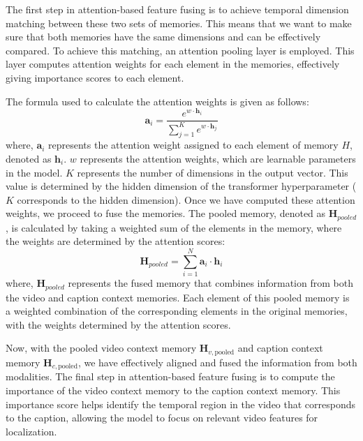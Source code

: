 The first step in attention-based feature fusing is to achieve temporal dimension matching between these two sets of memories.
This means that we want to make sure that both memories have the same dimensions and can be effectively compared.
To achieve this matching, an attention pooling layer is employed.
This layer computes attention weights for each element in the memories, effectively giving importance scores to each element.

The formula used to calculate the attention weights is given as follows:
\begin{equation}
    \bm{a}_{i} = \frac{e^{w \cdot \bm{h}_i}}{\sum_{j=1}^{K}e^{w \cdot \bm{h}_j}}
\end{equation}
where, $\bm{a}_{i}$ represents the attention weight assigned to each element of memory $H$, denoted as $\bm{h}_i$.
$w$ represents the attention weights, which are learnable parameters in the model.
$K$ represents the number of dimensions in the output vector.
This value is determined by the hidden dimension of the transformer hyperparameter ($K$ corresponds to the hidden dimension).
Once we have computed these attention weights, we proceed to fuse the memories.
The pooled memory, denoted as $\bm{H}_{pooled}$, is calculated by taking a weighted sum of the elements in the memory, where the weights are determined by the attention scores:
\begin{equation}
\bm{H}_{pooled} = \sum_{i=1}^{N}\bm{a}_i \cdot \bm{h}_i
\end{equation}
where, $\bm{H}_{pooled}$ represents the fused memory that combines information from both the video and caption context memories.
Each element of this pooled memory is a weighted combination of the corresponding elements in the original memories, with the weights determined by the attention scores.

Now, with the pooled video context memory $\bm{H}_{v,\text{pooled}}$ and caption context memory $\bm{H}_{c,\text{pooled}}$, we have effectively aligned and fused the information from both modalities.
The final step in attention-based feature fusing is to compute the importance of the video context memory to the caption context memory.
This importance score helps identify the temporal region in the video that corresponds to the caption, allowing the model to focus on relevant video features for localization.

